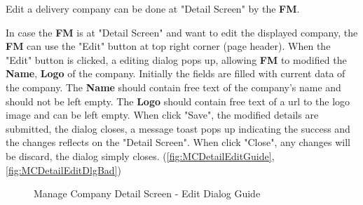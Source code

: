 Edit a delivery company can be done at "Detail Screen" by the \textbf{FM}.
\bigskip

In case the \textbf{FM} is at "Detail Screen" and want to edit the displayed company, the \textbf{FM} can use the "Edit" button at top right corner (page header). 
When the "Edit" button is clicked, a editing dialog pops up, allowing \textbf{FM} to modified the \textbf{Name}, \textbf{Logo} of the company. Initially the fields are filled with current data of the company. The \textbf{Name} should contain free text of the company's name and should not be left empty. The \textbf{Logo} should contain free text of a url to the logo image and can be left empty.
When click "Save", the modified details are submitted, the dialog closes, a message toast pops up indicating the success and the changes reflects on the "Detail Screen". When click "Close", any changes will be discard, the dialog simply closes. (\autoref{fig:MCDetailEditGuide}, \autoref{fig:MCDetailEditDlgBad})

\begin{figure}[H]
	\centering
    \vspace{5pt}
    \hspace{5pt}
    \caption{Manage Company Detail Screen - Edit Dialog Guide}
	\label{fig:MCDetailEditGuide}
\end{figure}

